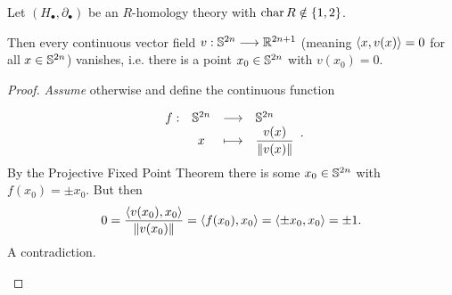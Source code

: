 	\begin{theorem}
		Let $(H_\bullet, \partial_\bullet)$ be an $R$-homology theory with $\characteristic R \notin \{1,2\}$.

		Then every continuous vector field $v:\S^{2n} --> \R^{2n+1}$ (meaning $\scalarproduct{x}{v(x)} = 0$ for all $x \in \S^{2n}$) vanishes, i.e. there is a point $x_0 \in \S^{2n}$ with $v(x_0) = 0$.
	\end{theorem}
	\begin{proof}
		\textit{Assume} otherwise and define the continuous function
		\begin{tab}[1.3cm]
		\begin{equation*}
			\begin{array}{rccl}
				f: & \S^{2n} & \longrightarrow & \S^{2n}\\
				& x & \longmapsto & \dfrac{v(x)}{\Norm{v(x)}}
			\end{array}.
		\end{equation*}
		By the Projective Fixed Point Theorem there is some $x_0 \in \S^{2n}$ with $f(x_0) = \pm x_0$. But then
		\begin{equation*}
			0 = \dfrac{\scalarproduct{v(x_0)}{x_0}}{\Norm{v(x_0)}} = \scalarproduct{f(x_0)}{x_0} = \scalarproduct{\pm x_0}{x_0} = \pm 1.
		\end{equation*}
		A contradiction.\vspace{-2em}
		\end{tab}
	\end{proof}

